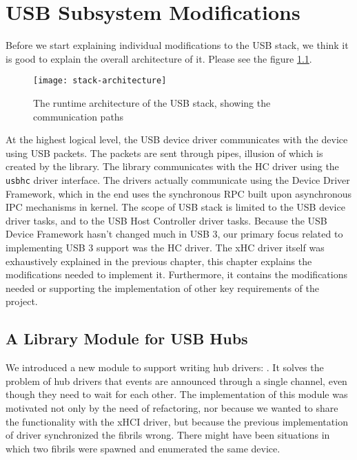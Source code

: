 \chapter{USB Subsystem Modifications}
\label{usb-refactoring}

Before we start explaining individual modifications to the USB stack, we think
it is good to explain the overall architecture of it. Please see the figure
\ref{fig:stack-architecture}.

\begin{figure}[h]
	\centering
	\texttt{[image: stack-architecture]}
	\caption{The runtime architecture of the USB stack, showing the communication paths}
	\label{fig:stack-architecture}
\end{figure}

At the highest logical level, the USB device driver communicates with the
device using USB packets. The packets are sent through pipes, illusion of which
is created by the  library. The library communicates with the HC
driver using the \texttt{usbhc} driver interface. The drivers actually
communicate using the Device Driver Framework, which in the end uses the
synchronous RPC built upon asynchronous IPC mechanisms in kernel. The
scope of USB stack is limited to the USB device driver tasks, and to the USB
Host Controller driver tasks. Because the USB Device Framework hasn't changed much
in USB 3, our primary focus related to implementing USB 3 support was the HC
driver. The xHC driver itself was exhaustively explained in the previous
chapter, this chapter explains the modifications needed to implement it.
Furthermore, it contains the modifications needed or supporting the
implementation of other key requirements of the project.





\section{A Library Module for USB Hubs}
\label{hub-port-refactoring}

We introduced a new module to support writing hub drivers:
. It solves the problem of
hub drivers that events are announced through a single channel, even though
they need to wait for each other. The implementation of this module was
motivated not only by the need of refactoring, nor because we wanted to share
the functionality with the xHCI driver, but because the previous implementation
of  driver synchronized the fibrils wrong. There might have been
situations in which two fibrils were spawned and enumerated the same device.

